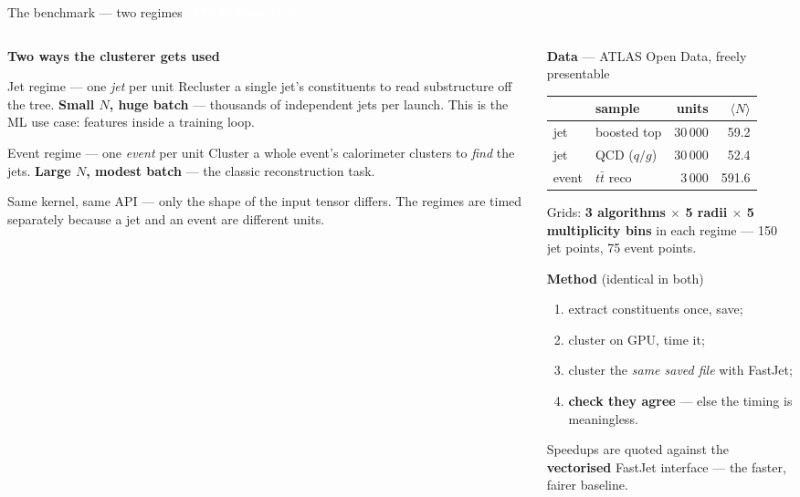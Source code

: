 \documentclass[aspectratio=169,10pt]{beamer}
\newcommand{\smallnote}[1]{{\footnotesize\color{fjgray} #1}}
\newcommand{\realC}{{\footnotesize\normalfont\textcolor{white}{[ATLAS Open Data]}}}
\begin{document}
\begin{frame}{The benchmark --- two regimes \hfill \realC}
\begin{columns}[T]
\begin{column}{0.53\textwidth}
\textbf{Two ways the clusterer gets used}
\smallskip

\begin{block}{\textcolor{regjet}{Jet regime} --- one \emph{jet} per unit}
\small Recluster a single jet's constituents to read substructure off the tree.
\textbf{Small $N$, huge batch} --- thousands of independent jets per launch.
\smallnote{This is the ML use case: features inside a training loop.}
\end{block}

\begin{block}{\textcolor{regevt}{Event regime} --- one \emph{event} per unit}
\small Cluster a whole event's calorimeter clusters to \emph{find} the jets.
\textbf{Large $N$, modest batch} --- the classic reconstruction task.
\end{block}
\smallnote{Same kernel, same API --- only the shape of the input tensor differs.
The regimes are timed separately because a jet and an event are different units.}
\end{column}
\begin{column}{0.47\textwidth}
\textbf{Data} --- ATLAS Open Data, freely presentable
\smallskip

{\footnotesize
\begin{tabular}{@{}llrr@{}}
\toprule
& sample & units & $\langle N\rangle$\\
\midrule
\textcolor{regjet}{jet} & boosted top & 30\,000 & 59.2\\
\textcolor{regjet}{jet} & QCD ($q/g$) & 30\,000 & 52.4\\
\textcolor{regevt}{event} & $t\bar t$ reco & 3\,000 & 591.6\\
\bottomrule
\end{tabular}}
\smallskip

\smallnote{Grids: \textbf{3 algorithms $\times$ 5 radii $\times$ 5 multiplicity
bins} in each regime --- 150 jet points, 75 event points.}
\medskip

\textbf{Method} \smallnote{(identical in both)}
\begin{enumerate}\setlength\itemsep{0pt}
  \item extract constituents once, save;
  \item cluster on GPU, time it;
  \item cluster the \emph{same saved file} with FastJet;
  \item \textbf{check they agree} --- else the timing is meaningless.
\end{enumerate}
\smallskip

\smallnote{Speedups are quoted against the \textbf{vectorised} FastJet
interface --- the faster, fairer baseline.}
\end{column}
\end{columns}
\end{frame}
\end{document}
